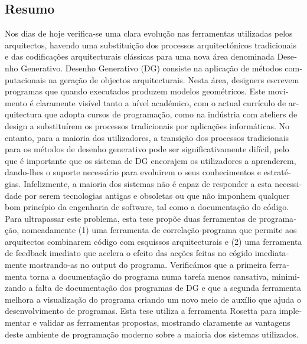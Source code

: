 
\begin{otherlanguage}{portuguese}





\chapter*{Resumo}
\thispagestyle{empty}

Nos dias de hoje verifica-se uma clara evolução nas ferramentas utilizadas pelos arquitectos, havendo uma substituição dos processos arquitectónicos tradicionais e das codificações arquitecturais clássicas para uma nova área denominada Desenho Generativo. Desenho Generativo (DG) consiste na aplicação de métodos computacionais na geração de objectos arquitecturais. Nesta área, designers escrevem programas que quando executados produzem modelos geométricos. Este movimento é claramente visível tanto a nível académico, com o actual currículo de arquitectura que adopta cursos de programação, como na indústria com ateliers de design a substituírem os processos tradicionais por aplicações informáticas. No entanto, para a maioria dos utilizadores, a transição dos processos tradicionais para os métodos de desenho generativo pode ser significativamente difícil, pelo que é importante que os sistema de DG encorajem os utilizadores a aprenderem, dando-lhes o suporte necessário para evoluirem o seus conhecimentos e estratégias. Infelizmente, a maioria dos sistemas não é capaz de responder a esta necessidade por serem tecnologias antigas e obsoletas ou que não imponhem qualquer bom princípio da engenharia de software, tal como a documentação do código. Para ultrapassar este problema, esta tese propõe duas ferramentas de programação, nomeadamente (1) uma ferramenta de correlação-programa que permite aos arquitectos combinarem código com esquissos arquitecturais e (2) uma ferramenta de feedback imediato que acelera o efeito das acções feitas no cógido imediatamente mostrando-as no output do programa. Verificámos que a primeira ferramenta torna a documentação do programa numa tarefa menos cansativa, minimizando a falta de documentação dos programas de DG e que a segunda ferramenta melhora a visualização do programa criando um novo meio de auxílio que ajuda o desenvolvimento de programas. Esta tese utiliza a ferramenta Rosetta para implementar e validar as ferramentas propostas, mostrando claramente as vantagens deste ambiente de programação moderno sobre a maioria dos sistemas utilizados.

\begin{flushleft}
\end{flushleft}

\end{otherlanguage}

